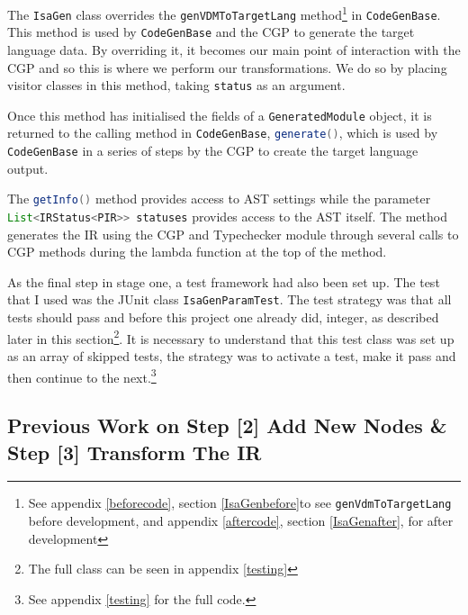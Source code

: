     The \lstinline[language=Java]{IsaGen} class overrides the \lstinline[language=Java]{genVDMToTargetLang} method\footnote{See appendix \ref{beforecode}, section \ref{IsaGenbefore}to see \lstinline[language=Java]{genVdmToTargetLang} before development, and appendix \ref{aftercode}, section \ref{IsaGenafter}, for after development} in \lstinline[language=Java]{CodeGenBase}. This method is used by \lstinline[language=Java]{CodeGenBase} and the CGP to generate the target language data. By overriding it, it becomes our main point of interaction with the CGP and so this is where we perform our transformations. We do so by placing visitor classes in this method, taking \lstinline[language=Java]{status} as an argument. 

    Once this method has initialised the fields of a \lstinline[language=Java]{GeneratedModule} object, it is returned to the calling method in \lstinline[language=Java]{CodeGenBase}, \lstinline[language=Java]{generate()}, which is used by \lstinline[language=Java]{CodeGenBase} in a series of steps by the CGP to create the target language output.
   
	The \lstinline[language=Java]{getInfo()} method provides access to AST settings while the parameter \lstinline[language=Java]{List<IRStatus<PIR>> statuses} provides access to the AST itself. The method generates the IR using the CGP and Typechecker module through several calls to CGP methods during the lambda function at the top of the method. 

	As the final step in stage one, a test framework had also been set up. The test that I used was the JUnit class \lstinline[language=Java]{IsaGenParamTest}. The test strategy was that all tests should pass and before this project one already did, integer, as described later in this section\footnote{The full class can be seen in appendix \ref{testing}}. It is necessary to understand that this test class was set up as an array of skipped tests, the strategy was to activate a test, make it pass and then continue to the next.\footnote{See appendix \ref{testing} for the full code.}

	
	\subsection{Previous Work on Step [2] Add New Nodes \& Step [3] Transform The IR} \label{pwos}

